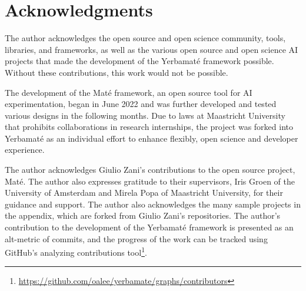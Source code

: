 

\section{Acknowledgments}

The author acknowledges the open source and open science community, tools, libraries, and frameworks, as well as the various open source and open science AI projects that made the development of the Yerbamaté framework possible. Without these contributions, this work would not be possible.

The development of the Maté framework, an open source tool for AI experimentation, began in June 2022
 and was further developed and tested various designs in the following months. Due to laws at Maastricht University that prohibits collaborations in research internships, the project was forked into Yerbamaté as an individual effort to enhance flexibly, open science and developer experience. 

The author acknowledges Giulio Zani's contributions to the open source project, Maté. The author also expresses gratitude to their supervisors, Iris Groen of the University of Amsterdam and Mirela Popa of Maastricht University, for their guidance and support. The author also acknowledges the many sample projects in the appendix, which are forked from Giulio Zani's repositories. The author's contribution to the development of the Yerbamaté framework is presented as an alt-metric of commits, and the progress of the work can be tracked using GitHub's analyzing contributions tool\footnote{\url{https://github.com/oalee/yerbamate/graphs/contributors}}.


